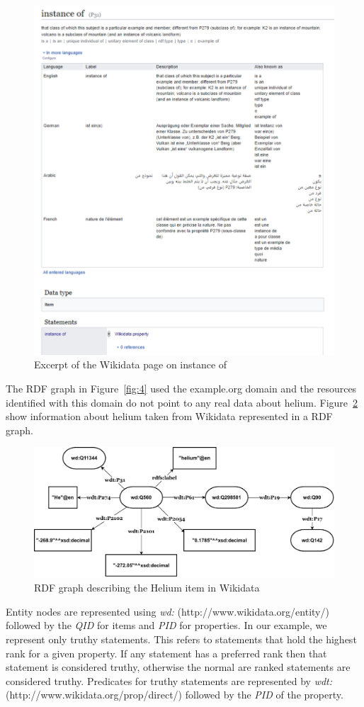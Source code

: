 \begin{figure}[h]
  \centering
  \includegraphics[width=0.75 \linewidth]{images/instance_of.pdf}
  \caption{Excerpt of the Wikidata page on instance of}
  \label{fig:6}
\end{figure}


The RDF graph in Figure~\ref{fig:4} used the example.org domain and the resources identified with this domain do not point to any real data about helium. Figure~\ref{fig:7} show information about helium taken from Wikidata represented in a RDF graph. 


\begin{figure}[h]
  \centering
  \includegraphics[width=0.75 \linewidth]{images/wikidata_graph.drawio.pdf}
  \caption{RDF graph describing the Helium item in Wikidata}
  \label{fig:7}
\end{figure}

Entity nodes are represented using \textit{wd:} (http://www.wikidata.org/entity/) followed by the \textit{QID} for items and \textit{PID} for properties. In our example, we represent only truthy statements. This refers to statements that hold the highest rank for a given property. If any statement has a preferred rank then that statement is considered truthy, otherwise the normal are ranked statements are considered truthy. Predicates for truthy statements are represented by \textit{wdt:} (http://www.wikidata.org/prop/direct/) followed by the \textit{PID} of the property. 

